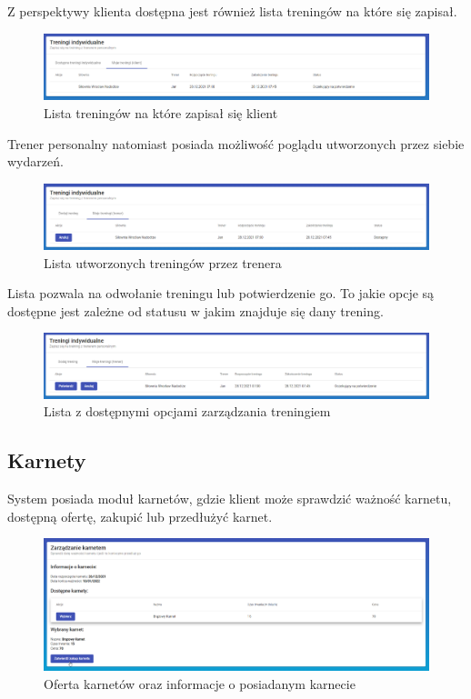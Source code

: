\documentclass[a4paper,twoside,12pt]{book}
\begin{document}
Z perspektywy klienta dostępna jest również lista treningów na które się zapisał.
\begin{figure}[H]
	\centering
	\includegraphics[width=1\linewidth]{../zrzuty_ekranu/dzialanie/treningi/klient_lista_treningow}
	\caption{Lista treningów na które zapisał się klient}
	\label{fig:klientlistatreningow}
\end{figure}

Trener personalny natomiast posiada możliwość poglądu utworzonych przez siebie wydarzeń.
\begin{figure}[H]
	\centering
	\includegraphics[width=1\linewidth]{../zrzuty_ekranu/dzialanie/treningi/trener_lista_treningow}
	\caption{Lista utworzonych treningów przez trenera}
	\label{fig:trenerlistatreningow}
\end{figure}

Lista pozwala na odwołanie treningu lub potwierdzenie go. To jakie opcje są dostępne jest zależne od statusu w jakim znajduje się dany trening.
\begin{figure}[H]
	\centering
	\includegraphics[width=1\linewidth]{../zrzuty_ekranu/dzialanie/treningi/trening_opcje_trener}
	\caption{Lista z dostępnymi opcjami zarządzania treningiem}
	\label{fig:treningopcjetrener}
\end{figure}

\subsection{Karnety}
System posiada moduł karnetów, gdzie klient może sprawdzić ważność karnetu, dostępną ofertę, zakupić lub przedłużyć karnet.
\begin{figure}[H]
	\centering
	\includegraphics[width=1\linewidth]{../zrzuty_ekranu/dzialanie/karnety/lista_karnetow}
	\caption{Oferta karnetów oraz informacje o posiadanym karnecie}
	\label{fig:listakarnetow}
\end{figure}
\end{document}
